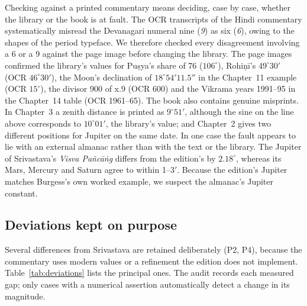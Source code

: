 \documentclass[11pt,a4paper]{article}
\begin{document}
Checking against a printed commentary means deciding, case by case, whether the library or the book is at fault. The OCR transcripts of the Hindi commentary systematically misread the Devanagari numeral nine (\textit{9}) as six (\textit{6}), owing to the shapes of the period typeface. We therefore checked every disagreement involving a 6 or a 9 against the page image before changing the library. The page images confirmed the library's values for Pu\d{s}ya's share of 76 ($106^\circ$), Rohi\d{n}\=i's $49^\circ30'$ (OCR $46^\circ30'$), the Moon's declination of $18^\circ54'11.5''$ in the Chapter~11 example (OCR $15^\circ$), the divisor 900 of x.9 (OCR 600) and the Vikrama years 1991--95 in the Chapter~14 table (OCR 1961--65). The book also contains genuine misprints. In Chapter~3 a zenith distance is printed as $9^\circ51'$, although the sine on the line above corresponds to $10^\circ01'$, the library's value; and Chapter~2 gives two different positions for Jupiter on the same date. In one case the fault appears to lie with an external almanac rather than with the text or the library. The Jupiter of Srivastava's \textit{Visva Pa\~nc\=a\.ng} differs from the edition's by $2.18^\circ$, whereas its Mars, Mercury and Saturn agree to within 1--3$'$. Because the edition's Jupiter matches Burgess's own worked example, we suspect the almanac's Jupiter constant.

\subsection{Deviations kept on purpose}
\label{sec:deviations}

Several differences from Srivastava are retained deliberately (P2, P4), because the commentary uses modern values or a refinement the edition does not implement. Table~\ref{tab:deviations} lists the principal ones. The audit records each measured gap; only cases with a numerical assertion automatically detect a change in its magnitude.
\end{document}
